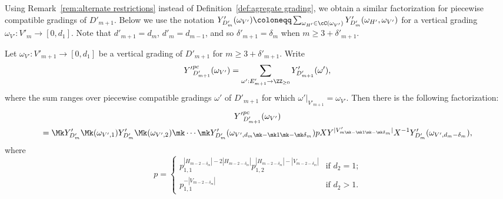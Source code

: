 Using Remark~\ref{rem:alternate restrictions} instead of Definition~\ref{def:agregate grading}, we obtain a similar factorization for piecewise compatible gradings of $D'_{m+1}$.
Below we use the notation $Y'_{D'_m}(\omega_{V'})\coloneqq \sum_{\omega_{H'}\in\cC(\omega_{V'})}Y'_{D'_m}(\omega_{H'},\omega_{V'})$ for a vertical grading $\omega_{V'}:V'_m\to[0,d_1]$.
Note that $d'_{m+1}=d_m$, $d'_m=d_{m-1}$, and so $\delta'_{m+1}=\delta_m$ when $m\ge3+\delta'_{m+1}$.
\begin{lemma}
 \label{le:piecewise compatible factorization 2}
 Let $\omega_{V'}:V'_{m+1}\to[0,d_1]$ be a vertical grading of $D'_{m+1}$ for $m\ge3+\delta'_{m+1}$.
 Write 
 \[{Y'}_{D'_{m+1}}^{pc}(\omega_{V'})=\sum\limits_{\omega':E'_{m+1}\to\ZZ_{\ge0}} Y'_{D'_{m+1}}(\omega'),\]
 where the sum ranges over piecewise compatible gradings $\omega'$ of $D'_{m+1}$ for which $\omega'|_{V'_{m+1}}=\omega_{V'}$.
 Then there is the following factorization:
 \begin{multline}
 \label{eq:piecewise compatible factorization 2}
 {Y'}_{D'_{m+1}}^{pc}(\omega_{V'})\\
 =\Mk Y'_{D'_m}\Mk (\omega_{V',1})Y'_{D'_m}\Mk (\omega_{V',2})\mk \cdots \mk Y'_{D'_m}(\omega_{V',d_m\mk -\mk 1\mk -\mk \delta_m})pXY^{|V'_{m\mk -\mk 1\mk -\mk \delta_m}|}X^{-1} Y'_{D'_m}(\omega_{V',d_m-\delta_m}),
 \end{multline}
 where 
 \[p=\begin{cases} p_{1,1}^{|H_{m-2-\delta_m}|-2|H_{m-2-\delta_m}|}p_{1,2}^{|H_{m-2-\delta_m}|-|V_{m-2-\delta_m}|} & \text{if $d_2=1$;}\\ p_{1,1}^{-|V_{m-2-\delta_m}|} & \text{if $d_2>1$.}\end{cases}\]
\end{lemma}
